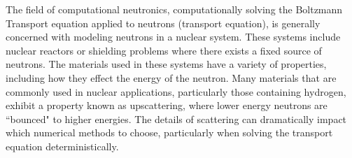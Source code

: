 
\DIFdelbegin %

\DIFdelend The field of computational neutronics, computationally solving the Boltzmann Transport equation applied to neutrons (transport equation), is generally concerned with modeling neutrons in a nuclear system. These systems include nuclear reactors or shielding problems where there exists a fixed source of neutrons. The materials used in these systems have a variety of properties, including how they effect the energy of the neutron. Many materials that are commonly used in nuclear applications, particularly those containing hydrogen, exhibit a property known as upscattering, where lower energy neutrons are ``bounced" to higher energies. The details of scattering can dramatically impact which numerical methods to choose, particularly when solving the transport equation deterministically. 

\DIFdelbegin {}\DIFdelend %
\DIFaddbegin 


